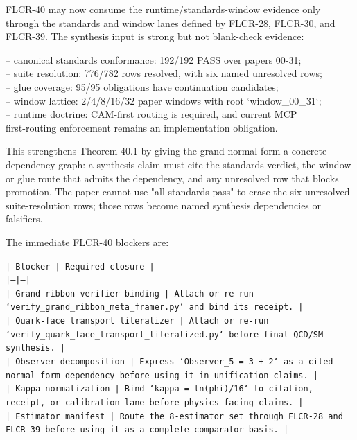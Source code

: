 \documentclass[11pt]{article}
\begin{document}
FLCR-40 may now consume the runtime/standards-window evidence only through the standards
and window lanes defined by FLCR-28, FLCR-30, and FLCR-39. The synthesis input
is strong but not blank-check evidence:

\noindent{}-- canonical standards conformance: 192/192 PASS over papers 00-31;\\
\noindent{}-- suite resolution: 776/782 rows resolved, with six named unresolved rows;\\
\noindent{}-- glue coverage: 95/95 obligations have continuation candidates;\\
\noindent{}-- window lattice: 2/4/8/16/32 paper windows with root `window\_00\_31`;\\
\noindent{}-- runtime doctrine: CAM-first routing is required, and current MCP\\
  first-routing enforcement remains an implementation obligation.

This strengthens Theorem 40.1 by giving the grand normal form a concrete
dependency graph: a synthesis claim must cite the standards verdict, the
window or glue route that admits the dependency, and any unresolved row that
blocks promotion. The paper cannot use "all standards pass" to erase the six
unresolved suite-resolution rows; those rows become named synthesis
dependencies or falsifiers.

The immediate FLCR-40 blockers are:

\noindent\texttt{| Blocker | Required closure |}\\
\noindent\texttt{|---|---|}\\
\noindent\texttt{| Grand-ribbon verifier binding | Attach or re-run `verify\_grand\_ribbon\_meta\_framer.py` and bind its receipt. |}\\
\noindent\texttt{| Quark-face transport literalizer | Attach or re-run `verify\_quark\_face\_transport\_literalized.py` before final QCD/SM synthesis. |}\\
\noindent\texttt{| Observer decomposition | Express `Observer\_5 = 3 + 2` as a cited normal-form dependency before using it in unification claims. |}\\
\noindent\texttt{| Kappa normalization | Bind `kappa = ln(phi)/16` to citation, receipt, or calibration lane before physics-facing claims. |}\\
\noindent\texttt{| Estimator manifest | Route the 8-estimator set through FLCR-28 and FLCR-39 before using it as a complete comparator basis. |}\\
\end{document}

